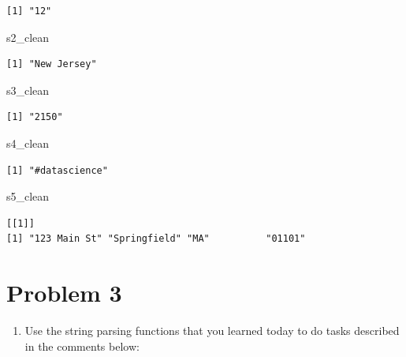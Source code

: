 \documentclass[
]{book}
\newenvironment{Shaded}{\begin{snugshade}}{\end{snugshade}}
\newcommand{\NormalTok}[1]{#1}
\providecommand{\tightlist}{%
  \setlength{\itemsep}{0pt}\setlength{\parskip}{0pt}}
\begin{document}
\begin{verbatim}
[1] "12"
\end{verbatim}

\begin{Shaded}
\begin{Highlighting}[]
\NormalTok{s2\_clean}
\end{Highlighting}
\end{Shaded}

\begin{verbatim}
[1] "New Jersey"
\end{verbatim}

\begin{Shaded}
\begin{Highlighting}[]
\NormalTok{s3\_clean}
\end{Highlighting}
\end{Shaded}

\begin{verbatim}
[1] "2150"
\end{verbatim}

\begin{Shaded}
\begin{Highlighting}[]
\NormalTok{s4\_clean}
\end{Highlighting}
\end{Shaded}

\begin{verbatim}
[1] "#datascience"
\end{verbatim}

\begin{Shaded}
\begin{Highlighting}[]
\NormalTok{s5\_clean}
\end{Highlighting}
\end{Shaded}

\begin{verbatim}
[[1]]
[1] "123 Main St" "Springfield" "MA"          "01101"      
\end{verbatim}

\hypertarget{problem-3}{%
\section{Problem 3}\label{problem-3}}

\begin{enumerate}
\def\labelenumi{\alph{enumi}.}
\tightlist
\item
  Use the string parsing functions that you learned today to do tasks described in the comments below:
\end{enumerate}
\end{document}

